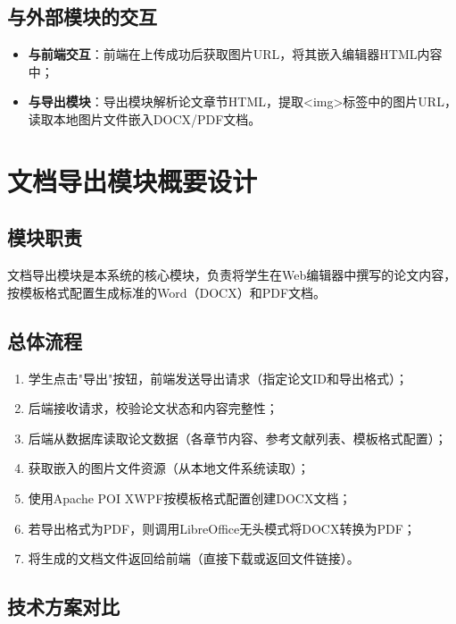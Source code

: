 \documentclass{../../softeng}
\begin{document}
\subsection{与外部模块的交互}

\begin{itemize}
    \item \textbf{与前端交互}：前端在上传成功后获取图片URL，将其嵌入编辑器HTML内容中；
    \item \textbf{与导出模块}：导出模块解析论文章节HTML，提取<img>标签中的图片URL，读取本地图片文件嵌入DOCX/PDF文档。
\end{itemize}

\section{文档导出模块概要设计}

\subsection{模块职责}

文档导出模块是本系统的核心模块，负责将学生在Web编辑器中撰写的论文内容，按模板格式配置生成标准的Word（DOCX）和PDF文档。

\subsection{总体流程}

\begin{enumerate}
    \item 学生点击"导出"按钮，前端发送导出请求（指定论文ID和导出格式）；
    \item 后端接收请求，校验论文状态和内容完整性；
    \item 后端从数据库读取论文数据（各章节内容、参考文献列表、模板格式配置）；
    \item 获取嵌入的图片文件资源（从本地文件系统读取）；
    \item 使用Apache POI XWPF按模板格式配置创建DOCX文档；
    \item 若导出格式为PDF，则调用LibreOffice无头模式将DOCX转换为PDF；
    \item 将生成的文档文件返回给前端（直接下载或返回文件链接）。
\end{enumerate}

\subsection{技术方案对比}
\end{document}
